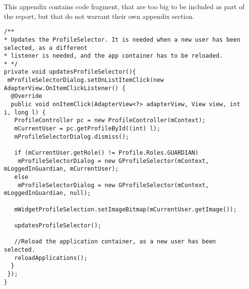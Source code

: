 This appendix contains code fragment, that are too big to be included as part of the report, but that do not warrant their own appendix section.

\begin{lstlisting}[caption={The method instantiating the Profile Selector with the correct arguments each time a new user is selected, inside the OnListItemClick listener.}, label={lst:newprofileselectoronitemclick}]
/**
* Updates the ProfileSelector. It is needed when a new user has been selected, as a different
* listener is needed, and the app container has to be reloaded.
* */
private void updatesProfileSelector(){
 mProfileSelectorDialog.setOnListItemClick(new AdapterView.OnItemClickListener() {
  @Override
  public void onItemClick(AdapterView<?> adapterView, View view, int i, long l) {
   ProfileController pc = new ProfileController(mContext);
   mCurrentUser = pc.getProfileById((int) l);
   mProfileSelectorDialog.dismiss();
  
   if (mCurrentUser.getRole() != Profile.Roles.GUARDIAN)
    mProfileSelectorDialog = new GProfileSelector(mContext, mLoggedInGuardian, mCurrentUser);
   else
    mProfileSelectorDialog = new GProfileSelector(mContext, mLoggedInGuardian, null);
  
   mWidgetProfileSelection.setImageBitmap(mCurrentUser.getImage());
  
   updatesProfileSelector();
  
   //Reload the application container, as a new user has been selected.
   reloadApplications();
  }
 });
} 
\end{lstlisting}